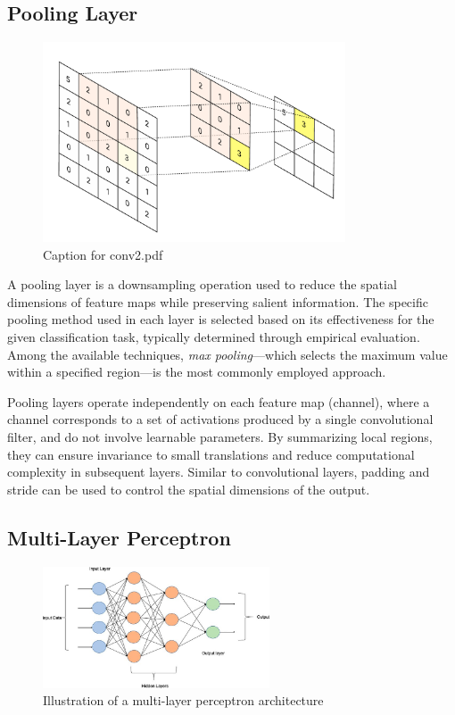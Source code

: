 \documentclass{pracalicmgr}
\begin{document}
\subsection{Pooling Layer}

\begin{figure}[H]
    \centering
    \includegraphics[width=0.8\textwidth]{src/pool1.pdf}
    \caption{Caption for conv2.pdf}
\end{figure}

A pooling layer is a downsampling operation used to reduce the spatial dimensions of feature maps while preserving salient information. The specific pooling method used in each layer is selected based on its effectiveness for the given classification task, typically determined through empirical evaluation. Among the available techniques, \textit{max pooling}—which selects the maximum value within a specified region—is the most commonly employed approach.

Pooling layers operate independently on each feature map (channel), where a channel corresponds to a set of activations produced by a single convolutional filter, and do not involve learnable parameters. By summarizing local regions, they can ensure invariance to small translations and reduce computational complexity in subsequent layers. Similar to convolutional layers, padding and stride can be used to control the spatial dimensions of the output.

\subsection{Multi-Layer Perceptron}


\begin{figure}[H]
\centering
\includegraphics[width=0.6\textwidth]{src/mlp.jpg}
\caption{Illustration of a multi-layer perceptron architecture}
\end{figure}
\end{document}
